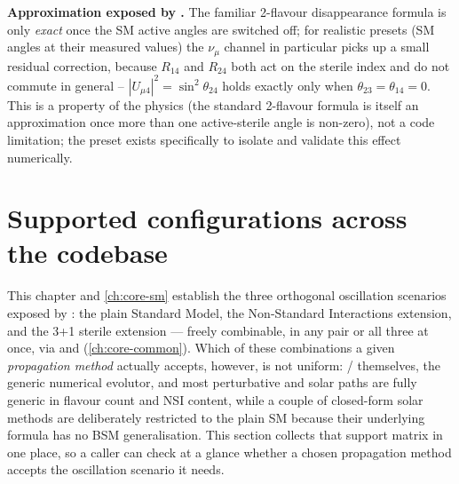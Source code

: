 \begin{notebox}
\textbf{Approximation exposed by .}
The familiar 2-flavour disappearance formula is only \emph{exact} once the
SM active angles are switched off; for realistic presets (SM angles at
their measured values) the $\nu_\mu$ channel in particular picks up a small
residual correction, because $R_{14}$ and $R_{24}$ both act on the sterile
index and do not commute in general -- $|U_{\mu4}|^2=\sin^2\theta_{24}$
holds exactly only when $\theta_{23}=\theta_{14}=0$. This is a property of
the physics (the standard 2-flavour formula is itself an approximation once
more than one active-sterile angle is non-zero), not a code limitation; the
preset exists specifically to isolate and validate this effect
numerically.
\end{notebox}

\section{Supported configurations across the codebase}
\label{sec:bsm-support-matrix}

This chapter and \cref{ch:core-sm} establish the three orthogonal
oscillation scenarios exposed by : the plain
Standard Model, the Non-Standard Interactions extension, and the 3+1
sterile extension --- freely combinable, in any pair or all three at once,
via  and 
(\cref{ch:core-common}). Which of these combinations a given
\emph{propagation method} actually accepts, however, is not uniform:
 /  themselves, the
generic numerical evolutor, and most perturbative and solar paths are fully
generic in flavour count and NSI content, while a couple of closed-form
solar methods are deliberately restricted to the plain SM because their
underlying formula has no BSM generalisation. This section collects that
support matrix in one place, so a caller can check at a glance whether a
chosen propagation method accepts the oscillation scenario it needs.

